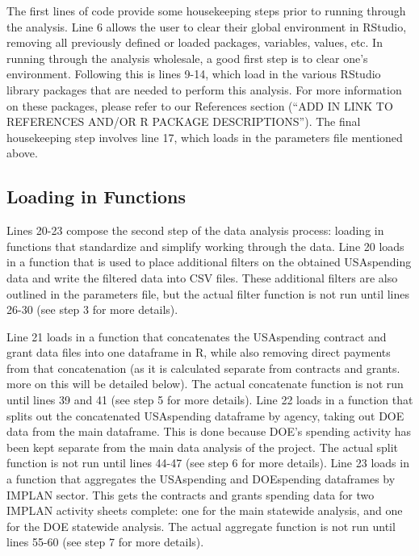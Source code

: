 \documentclass[
]{book}
\begin{document}
The first lines of code provide some housekeeping steps prior to running through the analysis. Line 6 allows the user to clear their global environment in RStudio, removing all previously defined or loaded packages, variables, values, etc. In running through the analysis wholesale, a good first step is to clear one's environment. Following this is lines 9-14, which load in the various RStudio library packages that are needed to perform this analysis. For more information on these packages, please refer to our References section (``ADD IN LINK TO REFERENCES AND/OR R PACKAGE DESCRIPTIONS''). The final housekeeping step involves line 17, which loads in the parameters file mentioned above.

\hypertarget{loading-in-functions}{%
\subsection{Loading in Functions}\label{loading-in-functions}}

Lines 20-23 compose the second step of the data analysis process: loading in functions that standardize and simplify working through the data. Line 20 loads in a function that is used to place additional filters on the obtained USAspending data and write the filtered data into CSV files. These additional filters are also outlined in the parameters file, but the actual filter function is not run until lines 26-30 (see step 3 for more details).

Line 21 loads in a function that concatenates the USAspending contract and grant data files into one dataframe in R, while also removing direct payments from that concatenation (as it is calculated separate from contracts and grants. more on this will be detailed below). The actual concatenate function is not run until lines 39 and 41 (see step 5 for more details). Line 22 loads in a function that splits out the concatenated USAspending dataframe by agency, taking out DOE data from the main dataframe. This is done because DOE's spending activity has been kept separate from the main data analysis of the project. The actual split function is not run until lines 44-47 (see step 6 for more details). Line 23 loads in a function that aggregates the USAspending and DOEspending dataframes by IMPLAN sector. This gets the contracts and grants spending data for two IMPLAN activity sheets complete: one for the main statewide analysis, and one for the DOE statewide analysis. The actual aggregate function is not run until lines 55-60 (see step 7 for more details).
\end{document}
